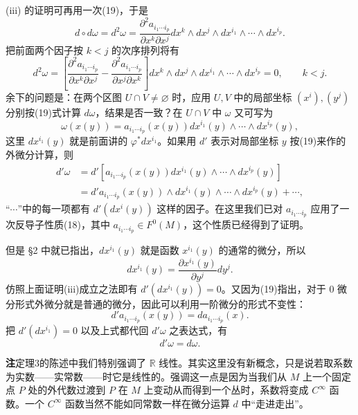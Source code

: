 (iii) 的证明可再用一次(19)，于是
\[
 d\circ d\omega=d^2\omega
 =\frac{\partial^2a_{i_1\cdots i_p}}{\partial x^k\partial x^j}
 dx^k\wedge dx^j\wedge dx^{i_1}\wedge\cdots\wedge dx^{i_p}.
\]
把前面两个因子按 $k<j$ 的次序排列将有
\[
 d^2\omega=
 \left[\frac{\partial^2a_{i_1\cdots i_p}}{\partial x^k\partial x^j}
 -\frac{\partial^2a_{i_1\cdots i_p}}{\partial x^j\partial x^k}\right]
 dx^k\wedge dx^j\wedge dx^{i_1}\wedge\cdots\wedge dx^{i_p}=0,
 \qquad k<j.
\]
余下的问题是：在两个区图 $U\cap V\ne\varnothing$ 时，应用 $U,V$ 中的局部坐标 $(x^i),(y^j)$ 分别按(19)式计算 $d\omega$，结果是否一致？在 $U\cap V$ 中 $\omega$ 又可写为
\[
 \omega(x(y))=a_{i_1\cdots i_p}(x(y))dx^{i_1}(y)\wedge\cdots\wedge dx^{i_p}(y),
\]
这里 $dx^{i_1}(y)$ 就是前面讲的 $\varphi^*dx^{i_1}$。如果用 $d'$ 表示对局部坐标 $y$ 按(19)来作的外微分计算，则
\begin{align*}
 d'\omega
 &=d'[a_{i_1\cdots i_p}(x(y))dx^{i_1}(y)\wedge\cdots\wedge dx^{i_p}(y)]\\
 &=d'a_{i_1\cdots i_p}(x(y))\wedge dx^{i_1}(y)\wedge\cdots\wedge dx^{i_p}(y)+\cdots,
\end{align*}
“$\cdots$”中的每一项都有 $d'(dx^{i}(y))$ 这样的因子。在这里我们已对 $a_{i_1\cdots i_p}$ 应用了一次反导子性质(18)，其中 $a_{i_1\cdots i_p}\in F^0(M)$，这个性质已经得到了证明。

但是 §2 中就已指出，$dx^{i_1}(y)$ 就是函数 $x^{i_1}(y)$ 的通常的微分，所以
\[
 dx^{i_1}(y)=\frac{\partial x^{i_1}(y)}{\partial y^j}dy^j.
\]
仿照上面证明(iii)成立之法即有 $d'(dx^{i_1}(y))=0$。又因为(19)指出，对于 $0$ 微分形式外微分就是普通的微分，因此可以利用一阶微分的形式不变性：
\[
 d'a_{i_1\cdots i_p}(x(y))=da_{i_1\cdots i_p}(x).
\]
把 $d'(dx^{i_1})=0$ 以及上式都代回 $d'\omega$ 之表达式，有
\[
 d'\omega=d\omega.
\]

\textbf{注}\quad 定理3的陈述中我们特别强调了 $\mathbb R$ 线性。其实这里没有新概念，只是说若取系数为实数——实常数——时它是线性的。强调这一点是因为当我们从 $M$ 上一个固定点 $P$ 处的外代数过渡到 $P$ 在 $M$ 上变动从而得到一个丛时，系数将变成 $C^\infty$ 函数。一个 $C^\infty$ 函数当然不能如同常数一样在微分运算 $d$ 中“走进走出”。

